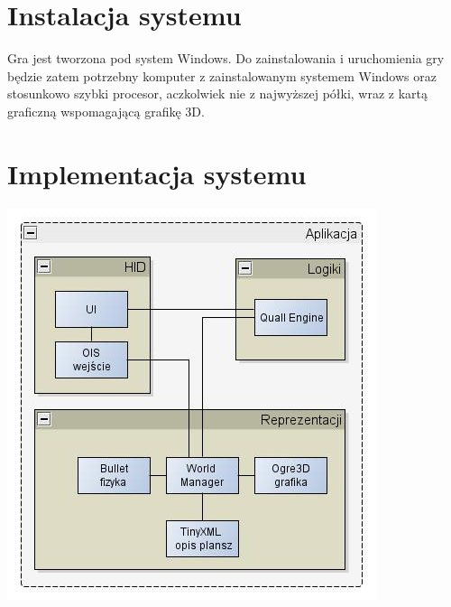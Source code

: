 \documentclass[12pt,a4paper,twoside]{article}
\begin{document}
\section{Instalacja systemu}


Gra jest tworzona pod system Windows. Do zainstalowania i uruchomienia gry będzie zatem potrzebny komputer z zainstalowanym systemem Windows oraz stosunkowo szybki procesor, aczkolwiek nie z najwyższej półki, wraz z kartą graficzną wspomagającą grafikę 3D. 


\section{Implementacja systemu}


\includegraphics{pics/ModuleCommunication.jpg}
\end{document}
